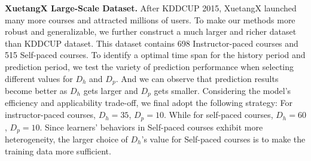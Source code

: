 	\noindent \textbf{XuetangX Large-Scale Dataset.}
 	After KDDCUP 2015, XuetangX launched many more courses and attracted millions of users. 
To make our methods more robust and generalizable, we further construct a much larger and richer dataset than KDDCUP dataset. This dataset contains 698 Instructor-paced courses and 515 Self-paced courses. To identify a optimal time span for the history period and prediction period, we test the variety of prediction performance when selecting different values for $D_h$ and $D_p$. And we can observe that prediction results become better as $D_h$ gets larger and $D_p$ gets smaller. Considering the model's efficiency and applicability trade-off, we final adopt the following strategy: For instructor-paced courses, $D_h=35$, $D_p=10$. While for self-paced courses, $D_h=60$, $D_p=10$. Since learners’ behaviors
in Self-paced courses exhibit more heterogeneity, the larger
choice of $D_h$’s value for Self-paced courses is to make the
training data more sufficient.
	


